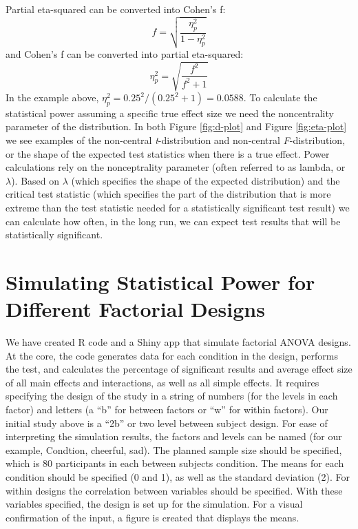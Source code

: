 \documentclass[,jou, draftfirst, a4paper,floatsintext]{apa6}
\begin{document}
Partial eta-squared can be converted into Cohen's f:
\begin{equation}
f = \sqrt{\frac{\eta_p^2}{1-\eta_p^2}} \label{eq:eta-to-f}
\end{equation}
and Cohen's f can be converted into partial eta-squared:
\begin{equation}
\eta_p^2 = \sqrt{\frac{f^2}{f^2+1}} \label{eq:f-to-eta}
\end{equation}
In the example above, \(\eta_p^2 = 0.25^2/(0.25^2+1) = 0.0588\).
To calculate the statistical power assuming a specific true effect size we need the noncentrality parameter of the distribution.
In both Figure \ref{fig:d-plot} and Figure \ref{fig:eta-plot} we see examples of the non-central \emph{t}-distribution and non-central \emph{F}-distribution, or the shape of the expected test statistics when there is a true effect.
Power calculations rely on the nonceptrality parameter (often referred to as lambda, or \(\lambda\)).
Based on \(\lambda\) (which specifies the shape of the expected distribution) and the critical test statistic (which specifies the part of the distribution that is more extreme than the test statistic needed for a statistically significant test result) we can calculate how often, in the long run, we can expect test results that will be statistically significant.

\hypertarget{simulating-statistical-power-for-different-factorial-designs}{%
\section{Simulating Statistical Power for Different Factorial Designs}\label{simulating-statistical-power-for-different-factorial-designs}}

We have created R code and a Shiny app that simulate factorial ANOVA designs.
At the core, the code generates data for each condition in the design, performs the test, and calculates the percentage of significant results and average effect size of all main effects and interactions, as well as all simple effects.
It requires specifying the design of the study in a string of numbers (for the levels in each factor) and letters (a \enquote{b} for between factors or \enquote{w} for within factors).
Our initial study above is a \enquote{2b} or two level between subject design.
For ease of interpreting the simulation results, the factors and levels can be named (for our example, Condtion, cheerful, sad).
The planned sample size should be specified, which is 80 participants in each between subjects condition.
The means for each condition should be specified (0 and 1), as well as the standard deviation (2).
For within designs the correlation between variables should be specified.
With these variables specified, the design is set up for the simulation.
For a visual confirmation of the input, a figure is created that displays the means.
\end{document}

